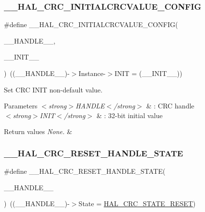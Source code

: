 \subsubsection{\texorpdfstring{\+\_\+\+\_\+\+H\+A\+L\+\_\+\+C\+R\+C\+\_\+\+I\+N\+I\+T\+I\+A\+L\+C\+R\+C\+V\+A\+L\+U\+E\+\_\+\+C\+O\+N\+F\+IG}{\_\_HAL\_CRC\_INITIALCRCVALUE\_CONFIG}}
{\footnotesize\ttfamily \#define \+\_\+\+\_\+\+H\+A\+L\+\_\+\+C\+R\+C\+\_\+\+I\+N\+I\+T\+I\+A\+L\+C\+R\+C\+V\+A\+L\+U\+E\+\_\+\+C\+O\+N\+F\+IG(\begin{DoxyParamCaption}\item[{}]{\+\_\+\+\_\+\+H\+A\+N\+D\+L\+E\+\_\+\+\_\+,  }\item[{}]{\+\_\+\+\_\+\+I\+N\+I\+T\+\_\+\+\_\+ }\end{DoxyParamCaption})~((\+\_\+\+\_\+\+H\+A\+N\+D\+L\+E\+\_\+\+\_\+)-\/$>$Instance-\/$>$I\+N\+IT = (\+\_\+\+\_\+\+I\+N\+I\+T\+\_\+\+\_\+))}



Set C\+RC I\+N\+IT non-\/default value. 


\begin{DoxyParams}{Parameters}
{\em $<$strong$>$\+H\+A\+N\+D\+L\+E$<$/strong$>$} & \+: C\+RC handle \\
\hline
{\em $<$strong$>$\+I\+N\+I\+T$<$/strong$>$} & \+: 32-\/bit initial value \\
\hline
\end{DoxyParams}

\begin{DoxyRetVals}{Return values}
{\em None.} & \\
\hline
\end{DoxyRetVals}
\mbox{\label{group___c_r_c___exported___macros_gab6ec5d74fdff177143f4b22652a18114}} 
\subsubsection{\texorpdfstring{\+\_\+\+\_\+\+H\+A\+L\+\_\+\+C\+R\+C\+\_\+\+R\+E\+S\+E\+T\+\_\+\+H\+A\+N\+D\+L\+E\+\_\+\+S\+T\+A\+TE}{\_\_HAL\_CRC\_RESET\_HANDLE\_STATE}}
{\footnotesize\ttfamily \#define \+\_\+\+\_\+\+H\+A\+L\+\_\+\+C\+R\+C\+\_\+\+R\+E\+S\+E\+T\+\_\+\+H\+A\+N\+D\+L\+E\+\_\+\+S\+T\+A\+TE(\begin{DoxyParamCaption}\item[{}]{\+\_\+\+\_\+\+H\+A\+N\+D\+L\+E\+\_\+\+\_\+ }\end{DoxyParamCaption})~((\+\_\+\+\_\+\+H\+A\+N\+D\+L\+E\+\_\+\+\_\+)-\/$>$State = \hyperlink{group___c_r_c___exported___types_gga1021d6f27a072d45f6f3b233eefd8bbea313bbe8353f8a8b48fbd129261266a97}{H\+A\+L\+\_\+\+C\+R\+C\+\_\+\+S\+T\+A\+T\+E\+\_\+\+R\+E\+S\+ET})}



